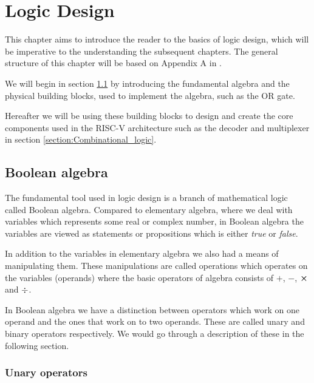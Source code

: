 \chapter{Logic Design}
    
    This chapter aims to introduce the reader to the basics of logic design, which will be imperative to the understanding the subsequent chapters. The general structure of this chapter will be based on Appendix A in \cite{riscVbook}. 
    
    We will begin in section \ref{section:Boolean_algebra} by introducing the fundamental algebra and the physical building blocks, used to implement the algebra, such as the OR gate. 
    
    Hereafter we will be using these building blocks to design and create the core components used in the RISC-V architecture such as the decoder and multiplexer in section \ref{section:Combinational_logic}. 

    \section{Boolean algebra}\label{section:Boolean_algebra}
    
        The fundamental tool used in logic design is a branch of mathematical logic called Boolean algebra. Compared to elementary algebra, where we deal with variables which represents some real or complex number, in Boolean algebra the variables are viewed as statements or propositions which is either \textit{true} or \textit{false}.
        
        In addition to the variables in elementary algebra we also had a means of manipulating them. These manipulations are called operations which operates on the variables (operands) where the basic operators of algebra consists of $+$, $-$, $\cross$ and $\divisionsymbol$.
        
        In Boolean algebra we have a distinction between operators which work on one operand and the ones that work on to two operands. These are called unary and binary operators respectively. We would go through a description of these in the following section. 
        
        \subsection{Unary operators}
        
